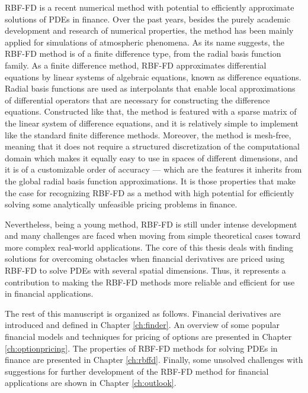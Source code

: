 \documentclass{UUThesisTemplate}
\begin{document}
\par RBF-FD is a recent numerical method with potential to efficiently approximate solutions of PDEs in finance. Over the past years, besides the purely academic development and research of numerical properties, the method has been mainly applied for simulations of atmospheric phenomena. As its name suggests, the RBF-FD method is of a finite difference type, from the radial basis function family. As a finite difference method, RBF-FD approximates differential equations by linear systems of algebraic equations, known as difference equations. Radial basis functions are used as interpolants that enable local approximations of differential operators that are necessary for constructing the difference equations. Constructed like that, the method is featured with a sparse matrix of the linear system of difference equations, and it is relatively simple to implement like the standard finite difference methods. Moreover, the method is mesh-free, meaning that it does not require a structured discretization of the computational domain which makes it equally easy to use in spaces of different dimensions, and it is of a customizable order of accuracy --- which are the features it inherits from the global radial basis function approximations. It is those properties that make the case for recognizing RBF-FD as a method with high potential for efficiently solving some analytically unfeasible pricing problems in finance.
\par Nevertheless, being a young method, RBF-FD is still under intense development and many challenges are faced when moving from simple theoretical cases toward more complex real-world applications. The core of this thesis deals with finding solutions for overcoming obstacles when financial derivatives are priced using RBF-FD to solve PDEs with several spatial dimensions. Thus, it represents a contribution to making the RBF-FD methods more reliable and efficient for use in financial applications. 
\par The rest of this manuscript is organized as follows. Financial derivatives are introduced and defined in Chapter \ref{ch:finder}. An overview of some popular financial models and techniques for pricing of options are presented in Chapter \ref{ch:optionpricing}. The properties of RBF-FD methods for solving PDEs in finance are presented in Chapter \ref{ch:rbffd}. Finally, some unsolved challenges with suggestions for further development of the RBF-FD method for financial applications are shown in Chapter \ref{ch:outlook}.
%
%
\end{document}
